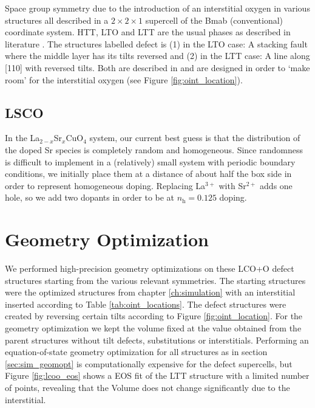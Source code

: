 \begin{table}
	\centering
	\caption[Oxygen interstitial phases]{Space group symmetry due to the introduction of an interstitial oxygen in various structures all described in a $2 \times 2 \times 1$ supercell of the Bmab (conventional) coordinate system. HTT, LTO and LTT are the usual phases as described in literature \cite{Hucker2012}. The structures labelled defect is (1) in the LTO case: A stacking fault where the middle layer has its tilts reversed and (2) in the LTT case: A line along [110] with reversed tilts. Both are described in \cite{Tranquada1994} and are designed in order to `make room' for the interstitial oxygen (see Figure \ref{fig:oint_location}).}
    \label{tab:oint_locations}
    
\end{table}

\subsection{LSCO}
In the La$_{2-x}$Sr$_x$CuO$_4$ system, our current best guess is that the distribution of the doped Sr species is completely random and homogeneous. Since randomness is difficult to implement in a (relatively) small system with periodic boundary conditions, we initially place them at a distance of about half the box side in order to  represent homogeneous doping. Replacing La$^{3+}$ with Sr$^{2+}$ adds one hole, so we add two dopants in order to be at $n_\text{h} = 0.125$ doping.

\section{Geometry Optimization}
We performed high-precision geometry optimizations on these LCO+O defect structures starting from the various relevant symmetries. The starting structures were the optimized structures from chapter \ref{ch:simulation} with an interstitial inserted according to Table \ref{tab:oint_locations}. The defect structures were created by reversing certain tilts according to Figure \ref{fig:oint_location}. For the geometry optimization we kept the volume fixed at the value obtained from the parent structures without tilt defects, substitutions or interstitials. Performing an equation-of-state geometry optimization for all structures as in section \ref{sec:sim_geomopt} is computationally expensive for the defect supercells, but Figure \ref{fig:lcoo_eos} shows a EOS fit of the LTT structure with a limited number of points, revealing that the Volume does not change significantly due to the interstitial.

